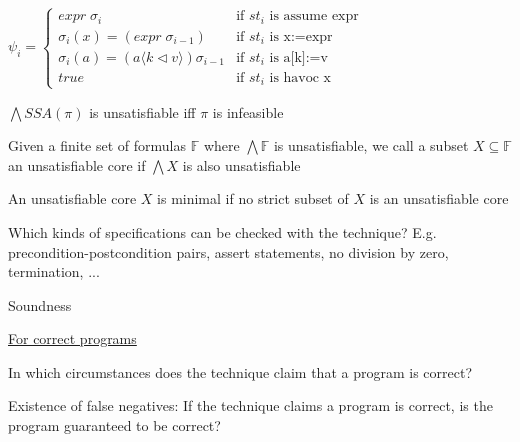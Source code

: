 \documentclass[a4paper]{article}
\begin{document}
\begin{minipage}[t]{0.16\linewidth}
\begin{betterlist}
{{\begin{betterlist}
\begin{betterlist}
						$\psi_i =
							\begin{cases}
								expr\;\sigma_i                                    & \text{if } st_i \text{ is  assume expr} \\
								\sigma_i(x) = (expr\;\sigma_{i−1})                & \text{if } st_i \text{ is  x:=expr}     \\
								\sigma_i(a) = (a⟨k \triangleleft v⟩) \sigma_{i−1} & \text{if } st_i \text{ is  a[k]:=v}     \\
								true                                              & \text{if } st_i \text{ is  havoc x}
							\end{cases}$
						\begin{betterlist}
							\item $\bigwedge SSA(\pi )$ is unsatisfiable iff $\pi$ is infeasible
						\end{betterlist}
						\item Given a finite set of formulas $\mathbb{F}$ where $\bigwedge \mathbb{F}$ is unsatisfiable, we call a subset $X \subseteq \mathbb{F}$ an \alert{unsatisfiable core} if $\bigwedge X$ is also unsatisfiable
						\begin{betterlist}
							\item An unsatisfiable core $X$ is \alert{minimal} if no strict subset of $X$ is an unsatisfiable core
						\end{betterlist}
					\end{betterlist}
				\end{betterlist}
			}}
		\item Which kinds of specifications can be checked with the technique? E.g. precondition-postcondition pairs, assert statements, no division by zero, termination, ...
		\item \alert{Soundness}
		\begin{betterlist}
			\item \underline{For correct programs}
			\begin{betterlist}
				\item In which circumstances does the technique claim that a program is correct?

				\item Existence of false negatives: If the technique claims a program is correct, is the program guaranteed to be correct?


\end{betterlist}
\end{betterlist}
\end{betterlist}
\end{minipage}
\end{document}
